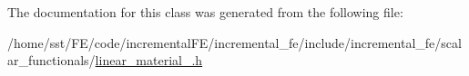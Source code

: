 The documentation for this class was generated from the following file\+:\begin{DoxyCompactItemize}
\item 
/home/sst/\+F\+E/code/incremental\+F\+E/incremental\+\_\+fe/include/incremental\+\_\+fe/scalar\+\_\+functionals/\hyperlink{linear__material__00_8h}{linear\+\_\+material\+\_.\+h}\end{DoxyCompactItemize}
